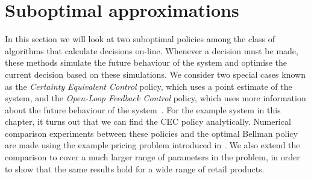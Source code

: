 \documentclass[main.tex]{subfiles}
\begin{document}
\section{Suboptimal
  approximations}\label{sec:suboptimal_approximations}
In this section we will look at two suboptimal policies among the class of
algorithms that calculate decisions on-line.
Whenever a decision must be made, these methods simulate the future
behaviour of the system and optimise the current decision based on
these simulations.
We consider two special cases known as the
\emph{Certainty Equivalent Control} policy, which uses a point
estimate of the system, and
the \emph{Open-Loop Feedback Control} policy, which uses more
information about the  future behaviour of the system~\citep[Ch.~6]{bertsekas2005dynamic}.
For the example system in this chapter, it turns out that we can find
the CEC policy analytically.
Numerical comparison experiments between these policies and the optimal
Bellman policy are
made using the example pricing problem introduced in
. We also extend the comparison to
cover a much larger range of parameters in the problem, in order to show that
the same results hold for a wide range of retail products.
\end{document}
